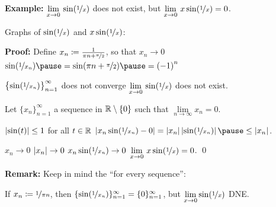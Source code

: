 \documentclass[10pt,aspectratio=169]{beamer}
\begin{document}
\begin{frame}

\textbf{Example:}
$\displaystyle \lim_{x \to 0} \, \sin( \nicefrac{1}{x} )$
does not exist, but 
$\displaystyle \lim_{x \to 0} \, x\sin( \nicefrac{1}{x} ) = 0$.

\pause
\medskip

Graphs of $\sin(\nicefrac{1}{x})$ and $x \sin(\nicefrac{1}{x})$:

\medskip


\pause
\medskip

\textbf{Proof:}
Define
$x_n \coloneqq \frac{1}{\pi n + \nicefrac{\pi}{2}}$, so that $x_n \to 0$
\pause
\wthus $\sin ( \nicefrac{1}{x_n} )
\pause
=
\sin (\pi n + \nicefrac{\pi}{2})
\pause
= {(-1)}^n$

\pause
\thus \quad $\bigl\{ \sin ( \nicefrac{1}{x_n} ) \bigr\}_{n=1}^\infty$ does not converge
\pause
\wthus
$\displaystyle \lim_{x \to 0} \, \sin( \nicefrac{1}{x} )$ does not exist.

\pause
\medskip

Let $\{ x_n \}_{n=1}^\infty$ a sequence in ${\mathbb{R}} \setminus \{ 0 \}$ such that
$\lim\limits_{n\to\infty} x_n = 0$.

\pause
$\left\lvert {\sin(t)} \right\rvert \leq 1$ for all $t \in {\mathbb{R}}$
\pause
\quad \thus \quad
$
\abs{x_n\sin(\nicefrac{1}{x_n})-0}
=
\abs{x_n}\abs{\sin(\nicefrac{1}{x_n})}
\pause
\leq
\abs{x_n}$.

\pause
\medskip

$x_n \to 0$
\pause
\wthus
$\left\lvert {x_n} \right\rvert \to 0$
\pause
\wthus
$x_n\sin(\nicefrac{1}{x_n}) \to 0$
\pause
\wthus
$\displaystyle \lim_{x \to 0} \, x\sin( \nicefrac{1}{x} ) = 0$.
\qed

\pause
\medskip

\textbf{Remark:} Keep
in mind the ``for every sequence'':

\pause
If $x_n \coloneqq \nicefrac{1}{\pi n}$, then
$\{ \sin (\nicefrac{1}{x_n}) \}_{n=1}^\infty = \{ 0 \}_{n=1}^\infty$, but $\displaystyle \lim_{x\to 0}
\sin(\nicefrac{1}{x})$ DNE.
\end{frame}
\end{document}
